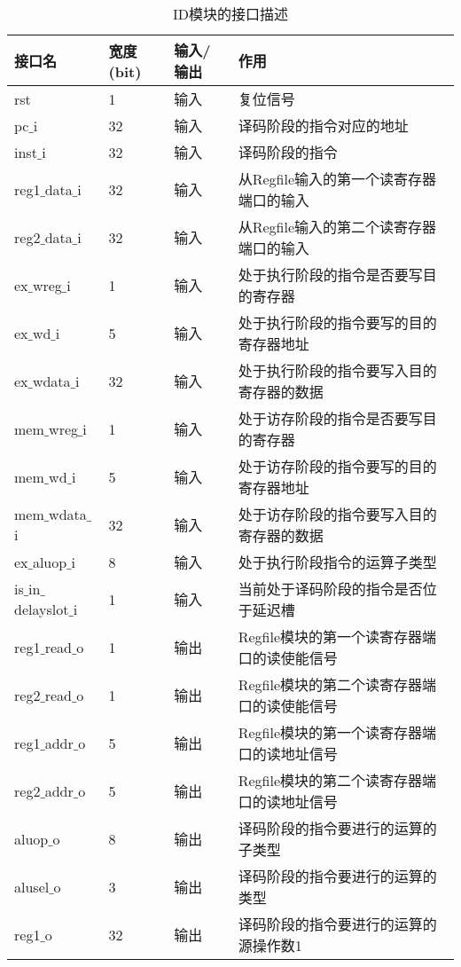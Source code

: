 \quad
\begin{table}[H]
	\centering
	\caption{ID模块的接口描述}
	\begin{tabular}{|l|l|l|l|}
		\hline
		接口名 & 宽度(bit) & 输入/输出 & 作用 \\
		\hline
		rst & 1 & 输入 & 复位信号 \\
		\hline
		pc$\_$i & 32 & 输入 & 译码阶段的指令对应的地址 \\
		\hline
		inst$\_$i & 32 & 输入 & 译码阶段的指令 \\
		\hline
		reg1$\_$data$\_$i & 32 & 输入 & 从Regfile输入的第一个读寄存器端口的输入 \\
		\hline
		reg2$\_$data$\_$i & 32 & 输入 & 从Regfile输入的第二个读寄存器端口的输入 \\
		\hline
		ex$\_$wreg$\_$i & 1 & 输入 & 处于执行阶段的指令是否要写目的寄存器 \\
		\hline
		ex$\_$wd$\_$i & 5 & 输入 & 处于执行阶段的指令要写的目的寄存器地址 \\
		\hline
		ex$\_$wdata$\_$i & 32 & 输入 & 处于执行阶段的指令要写入目的寄存器的数据 \\
		\hline
		mem$\_$wreg$\_$i & 1 & 输入 & 处于访存阶段的指令是否要写目的寄存器 \\
		\hline
		mem$\_$wd$\_$i & 5 & 输入 & 处于访存阶段的指令要写的目的寄存器地址 \\
		\hline
		mem$\_$wdata$\_$i & 32 & 输入 & 处于访存阶段的指令要写入目的寄存器的数据 \\
		\hline
		ex$\_$aluop$\_$i & 8 & 输入 & 处于执行阶段指令的运算子类型 \\
		\hline
		is$\_$in$\_$delayslot$\_$i & 1 & 输入 & 当前处于译码阶段的指令是否位于延迟槽 \\
		\hline
		reg1$\_$read$\_$o & 1 & 输出 & Regfile模块的第一个读寄存器端口的读使能信号 \\
		\hline
		reg2$\_$read$\_$o & 1 & 输出 & Regfile模块的第二个读寄存器端口的读使能信号 \\
		\hline
		reg1$\_$addr$\_$o & 5 & 输出 & Regfile模块的第一个读寄存器端口的读地址信号 \\
		\hline
		reg2$\_$addr$\_$o & 5 & 输出 & Regfile模块的第二个读寄存器端口的读地址信号 \\
		\hline
		aluop$\_$o & 8 & 输出 & 译码阶段的指令要进行的运算的子类型 \\
		\hline
		alusel$\_$o & 3 & 输出 & 译码阶段的指令要进行的运算的类型 \\
		\hline
		reg1$\_$o & 32 & 输出 & 译码阶段的指令要进行的运算的源操作数1 \\

\end{tabular}
\end{table}
